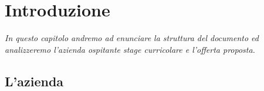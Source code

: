 \chapter{Introduzione}
\label{cap:introduzione}
%
%
%
%
%
%
%
\emph{In questo capitolo andremo ad enunciare la struttura del documento ed analizzeremo l'azienda ospitante stage curricolare e l'offerta proposta.}



\section{L'azienda}


